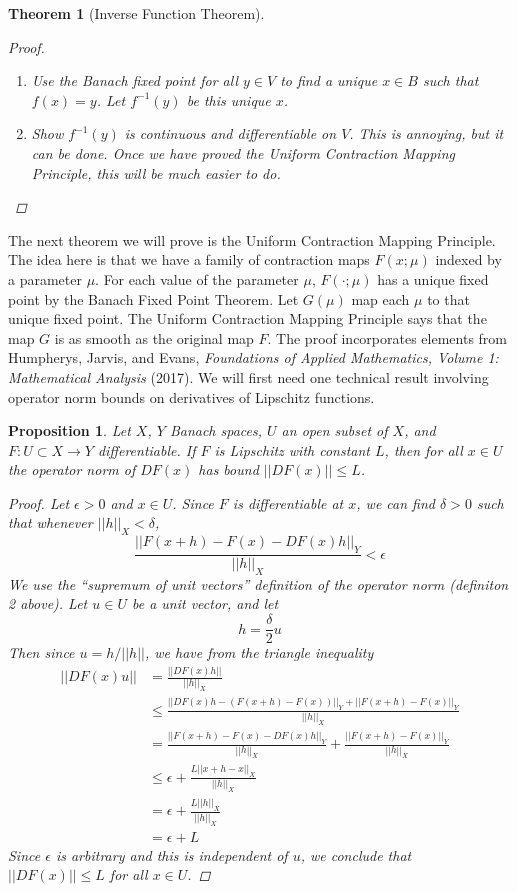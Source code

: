 \documentclass[10pt]{article}         %
\newtheorem{theorem}{Theorem}[section]
\newtheorem{proposition}{Proposition}[section]
\theoremstyle{remark}
\begin{document}
\begin{theorem}[Inverse Function Theorem]
\begin{proof}
\begin{enumerate}
    \item Use the Banach fixed point for all $y \in V$ to find a unique $x \in B$ such that $f(x) = y$. Let $f^{-1}(y)$ be this unique $x$.
    
    \item Show $f^{-1}(y)$ is continuous and differentiable on $V$. This is annoying, but it can be done. Once we have proved the Uniform Contraction Mapping Principle, this will be much easier to do.
\end{enumerate}
\end{proof}
\end{theorem}

The next theorem we will prove is the Uniform Contraction Mapping Principle. The idea here is that we have a family of contraction maps $F(x; \mu)$ indexed by a parameter $\mu$. For each value of the parameter $\mu$, $F(\cdot; \mu)$ has a unique fixed point by the Banach Fixed Point Theorem. Let $G(\mu)$ map each $\mu$ to that unique fixed point. The Uniform Contraction Mapping Principle says that the map $G$ is as smooth as the original map $F$. The proof incorporates elements from Humpherys, Jarvis, and Evans, \emph{Foundations of Applied Mathematics, Volume 1: Mathematical Analysis} (2017). We will first need one technical result involving operator norm bounds on derivatives of Lipschitz functions. 

\begin{proposition}
Let $X$, $Y$ Banach spaces, $U$ an open subset of $X$, and $F: U \subset X \rightarrow Y$ differentiable. If $F$ is Lipschitz with constant $L$, then for all $x \in U$ the operator norm of $DF(x)$ has bound $||DF(x)|| \leq L$.
\begin{proof}
Let $\epsilon > 0$ and $x \in U$. Since $F$ is differentiable at $x$, we can find $\delta > 0$ such that whenever $||h||_X < \delta$,
\[
\frac{||F(x+h) - F(x) - DF(x)h||_Y}{||h||_X} < \epsilon
\]
We use the ``supremum of unit vectors'' definition of the operator norm (definiton 2 above). Let $u \in U$ be a unit vector, and let
\[
h = \frac{\delta}{2}u
\]
Then since $u = h/||h||$, we have from the triangle inequality
\begin{align*}
||DF(x)u|| &= \frac{||DF(x)h||}{||h||_X} \\
&\leq \frac{||DF(x)h - (F(x+h) - F(x))||_Y + ||F(x+h) - F(x)||_Y }{||h||_X} \\
&= \frac{||F(x+h) - F(x) - DF(x)h||_Y }{||h||_X} + \frac{||F(x+h) - F(x)||_Y }{||h||_X} \\
&\leq \epsilon + \frac{L||x + h - x||_X}{||h||_X} \\
&= \epsilon + \frac{L||h||_X}{||h||_X} \\
&= \epsilon + L
\end{align*}
Since $\epsilon$ is arbitrary and this is independent of $u$, we conclude that $||DF(x)|| \leq L$ for all $x \in U$.
\end{proof}
\end{proposition}
\end{document}
